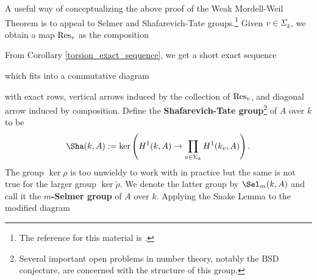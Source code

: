 \documentclass[11pt]{article}
\begin{document}
\begin{remark}
A useful way of conceptualizing the above proof of the Weak Mordell-Weil Theorem is to appeal to Selmer and Shafarevich-Tate groups.\footnote{The reference for this material is \cite{Poonen_SS}.} Given $v\in\Sigma_k$, we obtain a map $\operatorname{Res}_v$ as the composition
\begin{center}
\end{center}
From Corollary \ref{torsion_exact_sequence}, we get a short exact sequence
\begin{center}
\end{center}
which fits into a commutative diagram
\begin{center}
\end{center}
with exact rows, vertical arrows induced by the collection of $\operatorname{Res}_v$, and diagonal arrow induced by composition. Define the \textbf{Shafarevich-Tate group}\footnote{Several important open problems in number theory, notably the BSD conjecture, are concerned with the structure of this group.} of $A$ over $k$ to be
$$\Sha(k,A):=\ker\paren{H^1(k,A)\to\prod_{v\in\Sigma_k}H^1(k_v,A)}.$$
The group $\ker\rho$ is too unwieldy to work with in practice but the same is not true for the larger group $\ker\tilde{\rho}$. We denote the latter group by $\Sel_m(k,A)$ and call it the \textbf{$m$-Selmer group} of $A$ over $k$. Applying the Snake Lemma to the modified diagram 
\begin{center}
\end{center}
\end{remark}
\end{document}
